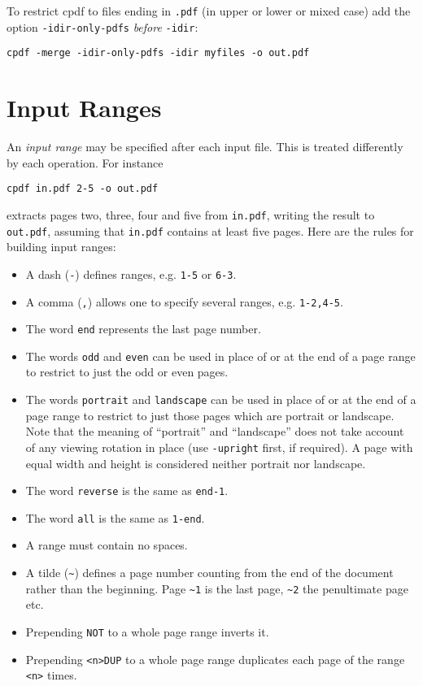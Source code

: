 \documentclass{book}
\begin{document}
To restrict cpdf to files ending in \texttt{.pdf} (in upper or lower or mixed case) add the option \texttt{-idir-only-pdfs} \textit{before} \texttt{-idir}:
  \begin{framed}
  \small\verb!cpdf -merge -idir-only-pdfs -idir myfiles -o out.pdf!
  \end{framed}


  \section{Input Ranges}
  An   \textit{input range} may be specified
after each input file. This is treated differently by each operation. For
instance
  \begin{framed}
  \small\verb!cpdf in.pdf 2-5 -o out.pdf!
  \end{framed}
  \noindent extracts pages two, three, four and five from \texttt{in.pdf},
writing the result to \texttt{out.pdf}, assuming that \texttt{in.pdf} contains
at least five pages.
  Here are the rules for building input ranges:
  \begin{itemize}
    \item A dash (\texttt{-}) defines ranges, e.g. \texttt{1-5} or \texttt{6-3}.
    \item A comma (\texttt{,}) allows one to specify several ranges, e.g. \texttt{1-2,4-5}.
    \item The word \texttt{end} represents the last page number.
    \item The words \texttt{odd} and \texttt{even} can be used in place of or at the end of a page range to restrict to just the odd or even pages.
    \item The words \texttt{portrait} and \texttt{landscape} can be used in place of or at the end of a page range to restrict to just those pages which are portrait or landscape. Note that the meaning of ``portrait'' and ``landscape'' does not take account of any viewing rotation in place (use \texttt{-upright} first, if required). A page with equal width and height is considered neither portrait nor landscape.
    \item The word \texttt{reverse} is the same as \texttt{end-1}.
    \item The word \texttt{all} is the same as \texttt{1-end}.
    \item A range must contain no spaces.
    \item A tilde (\texttt{\~{}}) defines a page number counting from the end of the document rather than the beginning. Page \texttt{\~{}1} is the last page, \texttt{\~{}2} the penultimate page etc.
    \item Prepending \texttt{NOT} to a whole page range inverts it. 
    \item Prepending \verb!<n>!\texttt{DUP} to a whole page range duplicates each page of the range \verb!<n>! times.
  \end{itemize}
 
\end{document}
